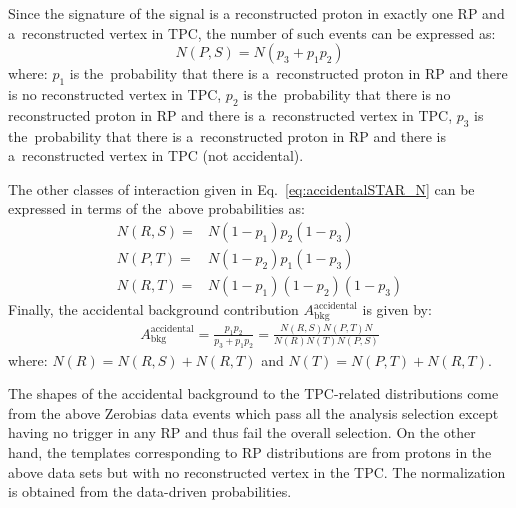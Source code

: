 Since the signature of the signal is a reconstructed proton in exactly one RP and a~reconstructed vertex in TPC, the number of such events can be expressed as:
\begin{equation}
N(P,S)=N\left(p_3+p_1p_2\right)
\end{equation}
where: $p_1$ is the~probability that there is a~reconstructed proton in RP and there is no reconstructed vertex in TPC, $p_2$ is the~probability that there is no reconstructed proton in RP and  there is a~reconstructed vertex in TPC, $p_3$ is the~probability that there is a~reconstructed proton in RP and  there is a~reconstructed vertex in TPC (not accidental).

The other classes of interaction given in Eq.~\eqref{eq:accidentalSTAR_N} can be expressed in terms of the~above probabilities as:
\begin{equation}
\begin{split}
N(R,S)=  & N(1-p_1)p_2(1-p_3)\\
N(P,T) = & N(1-p_2)p_1(1-p_3)\\
N(R,T) = & N(1-p_1)(1-p_2)(1-p_3)
\end{split}
\end{equation}
Finally, the accidental background contribution $A_{\mathrm{bkg} }^{\mathrm{accidental}}$ is  given by:
\begin{equation}
\begin{split}
A_{\mathrm{bkg}}^{\mathrm{accidental}}=  \frac{p_1p_2}{p_3+p_1p_2}=\frac{N(R,S)N(P,T)N}{N(R)N(T)N(P,S)}
\end{split}
\end{equation} 
where: $N(R)=N(R,S)+N(R,T)$ and $N(T)=N(P,T)+N(R,T)$.

The shapes of the accidental background to the TPC-related distributions come from the above Zerobias data events which pass all the analysis selection except having no trigger in any RP and  thus fail the overall selection. On the other hand, the templates corresponding to RP distributions are from protons in the above data sets but with no reconstructed vertex in the TPC. The normalization is obtained from the data-driven probabilities.

